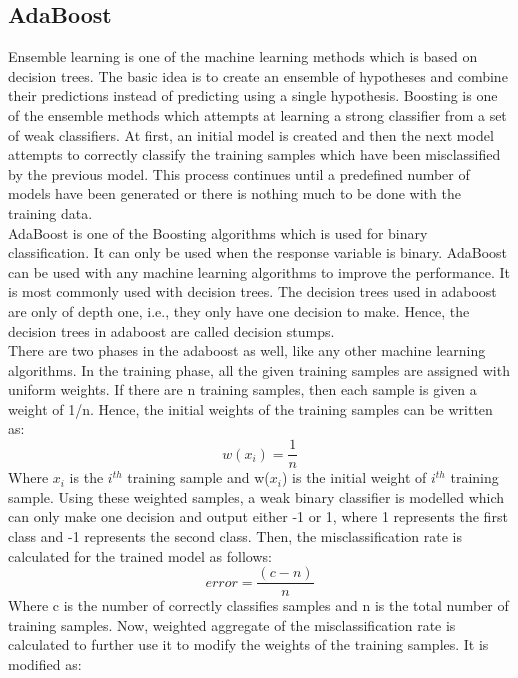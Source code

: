 \documentclass[sigconf]{acmart}
\begin{document}
\subsection{AdaBoost}
Ensemble learning is one of the machine learning methods which is based on decision trees. The basic idea is to create an ensemble of hypotheses and combine their predictions instead of predicting using a single hypothesis. Boosting is one of the ensemble methods which attempts at learning a strong classifier from a set of weak classifiers. At first, an initial model is created and then the next model attempts to correctly classify the training samples which have been misclassified by the previous model. This process continues until a predefined number of models have been generated or there is nothing much to be done with the training data. \\
AdaBoost is one of the Boosting algorithms which is used for binary classification. It can only be used when the response variable is binary. AdaBoost can be used with any machine learning algorithms to improve the performance. It is most commonly used with decision trees. The decision trees used in adaboost are only of depth one, i.e., they only have one decision to make. Hence, the decision trees in adaboost are called decision stumps. \\
There are two phases in the adaboost as well, like any other machine learning algorithms. In the training phase, all the given training samples are assigned with uniform weights. If there are n training samples, then each sample is given a weight of 1/n. Hence, the initial weights of the training samples can be written as:
\begin{equation}
    w(x_i) = \frac{1}{n}
\end{equation}
Where $x_i$ is the $i^{th}$ training sample and  w($x_i$) is the initial weight of $i^{th}$ training sample. Using these weighted samples, a weak binary classifier is modelled which can only make one decision and output either -1 or 1, where 1 represents the first class and -1 represents the second class. Then, the misclassification rate is calculated for the trained model as follows:
\begin{equation}
    error = \frac{(c-n)}{n}
\end{equation}
Where c is the number of correctly classifies samples and n is the total number of training samples. Now, weighted aggregate of the misclassification rate is calculated to further use it to modify the weights of the training samples. It is modified as:
\end{document}
